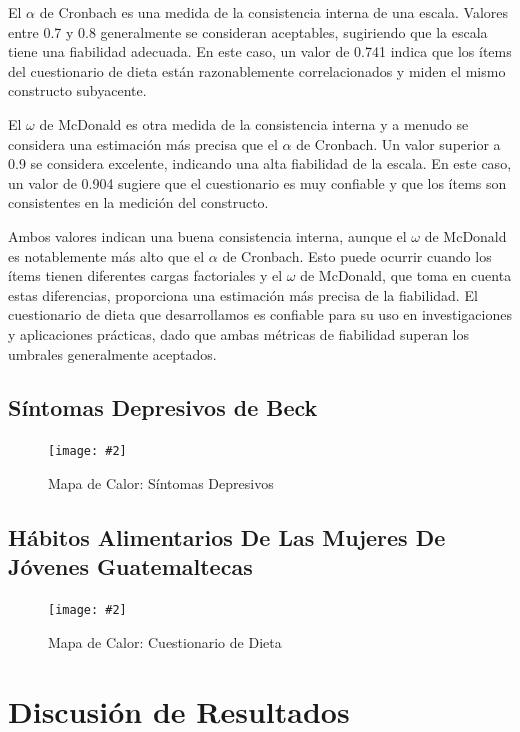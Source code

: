\documentclass[man]{apa7}
\newcommand{\includegraphicsmax}[2][]{%
	\texttt{[image: \#2]}%
}
\begin{document}
	El $\alpha$ de Cronbach es una medida de la consistencia interna de una escala.
	Valores entre 0.7 y 0.8 generalmente se consideran aceptables,
	sugiriendo que la escala tiene una fiabilidad adecuada. En este caso, un
	valor de 0.741 indica que los ítems del cuestionario de dieta están
	razonablemente correlacionados y miden el mismo constructo subyacente.

	El $\omega$ de McDonald es otra medida de la consistencia interna y a menudo se
	considera una estimación más precisa que el $\alpha$ de Cronbach. Un valor
	superior a 0.9 se considera excelente, indicando una alta fiabilidad de
	la escala. En este caso, un valor de 0.904 sugiere que el cuestionario
	es muy confiable y que los ítems son consistentes en la medición del
	constructo.

	Ambos valores indican una buena consistencia interna, aunque el $\omega$ de
	McDonald es notablemente más alto que el $\alpha$ de Cronbach. Esto puede
	ocurrir cuando los ítems tienen diferentes cargas factoriales y el $\omega$ de
	McDonald, que toma en cuenta estas diferencias, proporciona una
	estimación más precisa de la fiabilidad. El cuestionario de dieta que
	desarrollamos es confiable para su uso en investigaciones y aplicaciones
	prácticas, dado que ambas métricas de fiabilidad superan los umbrales
	generalmente aceptados.

	\subsection{Síntomas Depresivos de Beck}
		\begin{figure}[H]
		\centering
		\includegraphicsmax{sintomasDepresivosBeckGraph.pdf}
		\caption{Mapa de Calor: Síntomas Depresivos}
		\label{fig:Figure2}
	\end{figure}
	\vspace{-1em} %

	\subsection{Hábitos Alimentarios De Las Mujeres De Jóvenes Guatemaltecas}
		\begin{figure}[H]
			\centering
			\includegraphicsmax{dietGraph.pdf}
			\caption{Mapa de Calor: Cuestionario de Dieta}
			\label{fig:Figure3}
		\end{figure}

	\section{Discusión de Resultados}\label{discusiuxf3n-de-resultados}
\end{document}
